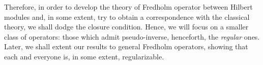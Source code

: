 Therefore, in order to develop the theory of Fredholm operator between Hilbert modules and, in some extent, try to obtain a correspondence with the classical theory, we shall dodge the closure condition. Hence, we will focus on a smaller class of operators: those which admit pseudo-inverse, henceforth, the \textit{regular} ones. Later, we shall extent our results to general Fredholm operators, showing that each and everyone is, in some extent, regularizable.





